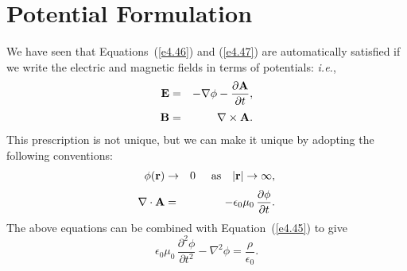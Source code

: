 \section{Potential Formulation}\label{s4.6}
We have seen that Equations~(\ref{e4.46}) and (\ref{e4.47}) are automatically satisfied
if we write the electric and magnetic fields in terms of potentials: {\em i.e.},
\begin{eqnarray}
{\bf E}& = &- \nabla\phi - \frac{\partial {\bf A}}{\partial t},\label{e4.48a}\\[0.5ex]
{\bf B}& = & \nabla\times{\bf A}.\label{e4.49}
\end{eqnarray}
This prescription is not unique, but we can make it unique by adopting the
following conventions:
\begin{eqnarray}
\phi({\bf r}) &\rightarrow & 0\mbox{\hspace{0.5cm}as~~~$|{\bf r}| \rightarrow \infty$},
\\[0.5ex]
\nabla\cdot {\bf A} &=& -\epsilon_0 \mu_0 \,\frac{\partial \phi}{\partial t}.
\end{eqnarray}
The above equations can be combined with Equation~(\ref{e4.45}) to give
\begin{equation}
\epsilon_0\mu_0\,\frac{\partial^2\phi}{\partial t^2} - \nabla^2\phi = \frac{\rho}
{\epsilon_0}.
\end{equation}

